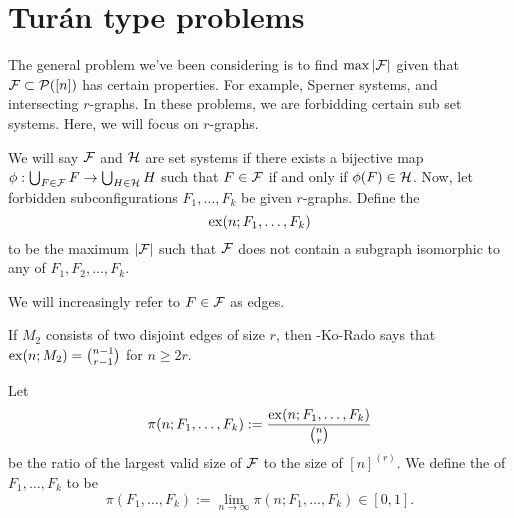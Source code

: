 
\section{Tur\'an type problems} %
\label{sec:turian_type_problems}

The general problem we've been considering is to find $\max |\mathcal{F}|$ given that $\mathcal{F}\subset \mathcal{P}([n])$ has certain properties. For example, Sperner systems, and intersecting $r$-graphs. In these problems, we are forbidding certain sub set systems. Here, we will focus on $r$-graphs.  

We will say $\mathcal{F}$ and $\mathcal{H}$ are  set systems if there exists a bijective map $\phi: \bigcup_{F\in \mathcal{F}} F \to \bigcup_{H\in \mathcal{H}}H$ such that $F\in \mathcal{F}$ if and only if $\phi(F)\in \mathcal{H}$.
Now, let forbidden subconfigurations $F_1,\dotsc,F_k$ be given $r$-graphs. Define the 
\[
\operatorname{ex} (n; F_1,\dotsc,F_k)
\]
to be the maximum $|\mathcal{F}|$ such that $\mathcal{F}$ does not contain a subgraph isomorphic to any of $F_1,F_2,\dotsc,F_k$.


\begin{remark}
We will increasingly refer to $F\in \mathcal{F}$ as edges.
\end{remark}

\begin{example}
If $M_2$ consists of two disjoint edges of size $r$, then \erdos-Ko-Rado says that $\operatorname{ex}(n;M_2) = {n-1\choose r-1}$ for $n\geq 2r$.
\end{example}
Let
\[
\pi(n;F_1,\dotsc,F_k) := \frac{\operatorname{ex}(n;F_1,\dotsc,F_k)}{{n\choose r}}
\]
be the ratio of the largest valid size of $\mathcal{F}$ to the size of $[n]^{(r)}$.
We define the  of $F_1,\dotsc,F_k$ to be
\[
\pi(F_1,\dotsc,F_k) := \lim_{n\to\infty} \pi(n; F_1,\dotsc,F_k) \in [0,1].
\]

